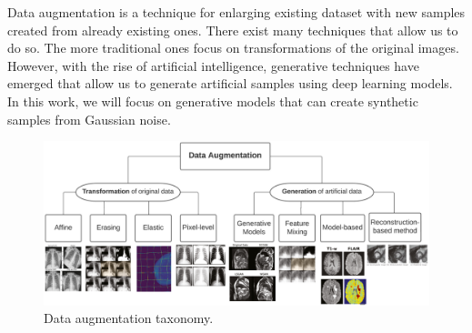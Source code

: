 Data augmentation is a technique for enlarging existing dataset with new samples created from already existing ones. There exist many techniques that allow us to do so. The more traditional ones focus on transformations of the original images. However, with the rise of artificial intelligence, generative techniques have emerged that allow us to generate artificial samples using deep learning models. In this work, we will focus on generative models that can create synthetic samples from Gaussian noise. 


\begin{figure}[H]
    \centering
    \includegraphics[width=0.99\linewidth]{background/taxonomy-data-augmentation.jpg}
    \caption{Data augmentation taxonomy\cite{GARCEA2023106391}.}
    \label{fig:enter-label}
\end{figure}



